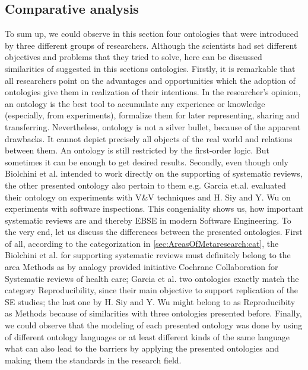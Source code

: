 	\subsection{Comparative analysis}
	To sum up, we could observe in this section four ontologies that were introduced by three different groups of researchers. Although the scientists had set different objectives and problems that they tried to solve, here can be discussed similarities of suggested in this sections ontologies. Firstly, it is remarkable that all researchers point on the advantages and opportunities which the adoption of ontologies give them in realization of their intentions. In the researcher's opinion, an ontology is the best tool to accumulate any experience or knowledge (especially, from experiments), formalize them for later representing, sharing and transferring. Nevertheless, ontology is not a silver bullet, because of the apparent drawbacks. It cannot depict precisely all objects of the real world and relations between them. An ontology is still restricted by the first-order logic. But sometimes it can be enough to get desired results. Secondly, even though only Biolchini et al.\cite{Bio07} intended to work directly on the supporting of systematic reviews, the other presented ontology also pertain to them e.g. Garcia et.al.\cite{Gar08} evaluated their ontology on experiments with V\&V techniques\cite{Bas87} and H. Siy and Y. Wu \cite{SiyWu12} on experiments with software inspections\cite{Bas99}. This congeniality shows us, how important systematic reviews are and thereby EBSE in modern Software Engineering.\newline
	To the very end, let us discuss the differences between the presented ontologies. First of all, according to the categorization in \autoref{sec:AreasOfMetaresearch:cat}, the Biolchini et al. for supporting systematic reviews\cite{Bio07} must definitely belong to the area Methods as by analogy provided initiative Cochrane Collaboration for Systematic reviews of health care; Garcia et al. two ontologies\cite{Gar08}\cite{Gar11} exactly match the category Reproducibility, since their main objective to support replication of the SE studies; the last one by H. Siy and Y. Wu\cite{SiyWu12} might belong to as Reproducibity as Methods because of similarities with three ontologies presented before. Finally, we could observe that the modeling of each presented ontology was done by using of different ontology languages or at least different kinds of the same language what can also lead to the barriers by applying the presented ontologies and making them the standards in the research field.
	  	 
